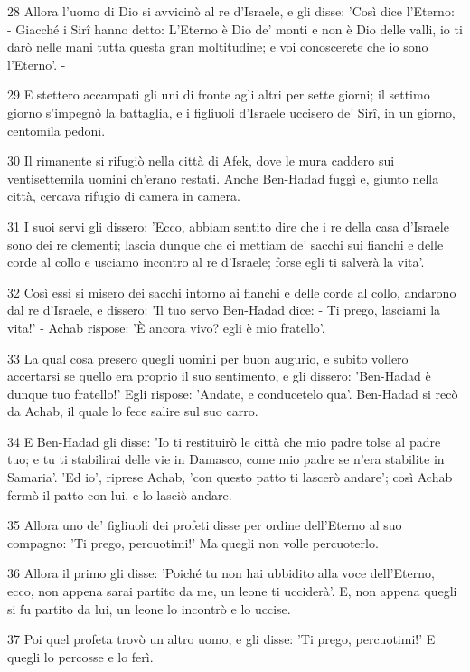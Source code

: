 \par 28 Allora l'uomo di Dio si avvicinò al re d'Israele, e gli disse: 'Così dice l'Eterno: - Giacché i Sirî hanno detto: L'Eterno è Dio de' monti e non è Dio delle valli, io ti darò nelle mani tutta questa gran moltitudine; e voi conoscerete che io sono l'Eterno'. -
\par 29 E stettero accampati gli uni di fronte agli altri per sette giorni; il settimo giorno s'impegnò la battaglia, e i figliuoli d'Israele uccisero de' Sirî, in un giorno, centomila pedoni.
\par 30 Il rimanente si rifugiò nella città di Afek, dove le mura caddero sui ventisettemila uomini ch'erano restati. Anche Ben-Hadad fuggì e, giunto nella città, cercava rifugio di camera in camera.
\par 31 I suoi servi gli dissero: 'Ecco, abbiam sentito dire che i re della casa d'Israele sono dei re clementi; lascia dunque che ci mettiam de' sacchi sui fianchi e delle corde al collo e usciamo incontro al re d'Israele; forse egli ti salverà la vita'.
\par 32 Così essi si misero dei sacchi intorno ai fianchi e delle corde al collo, andarono dal re d'Israele, e dissero: 'Il tuo servo Ben-Hadad dice: - Ti prego, lasciami la vita!' - Achab rispose: 'È ancora vivo? egli è mio fratello'.
\par 33 La qual cosa presero quegli uomini per buon augurio, e subito vollero accertarsi se quello era proprio il suo sentimento, e gli dissero: 'Ben-Hadad è dunque tuo fratello!' Egli rispose: 'Andate, e conducetelo qua'. Ben-Hadad si recò da Achab, il quale lo fece salire sul suo carro.
\par 34 E Ben-Hadad gli disse: 'Io ti restituirò le città che mio padre tolse al padre tuo; e tu ti stabilirai delle vie in Damasco, come mio padre se n'era stabilite in Samaria'. 'Ed io', riprese Achab, 'con questo patto ti lascerò andare'; così Achab fermò il patto con lui, e lo lasciò andare.
\par 35 Allora uno de' figliuoli dei profeti disse per ordine dell'Eterno al suo compagno: 'Ti prego, percuotimi!' Ma quegli non volle percuoterlo.
\par 36 Allora il primo gli disse: 'Poiché tu non hai ubbidito alla voce dell'Eterno, ecco, non appena sarai partito da me, un leone ti ucciderà'. E, non appena quegli si fu partito da lui, un leone lo incontrò e lo uccise.
\par 37 Poi quel profeta trovò un altro uomo, e gli disse: 'Ti prego, percuotimi!' E quegli lo percosse e lo ferì.
